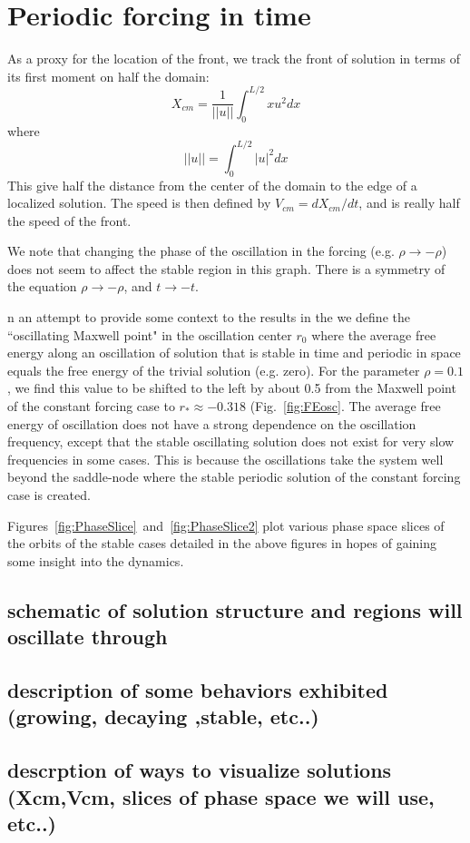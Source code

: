 \documentclass[../main/TimeForcingSHE.tex]{subfiles}
\begin{document}
\section{Periodic forcing in time }
As a proxy for the location of the front, we track the front of solution in terms of its first moment on half the domain:
\begin{equation}
X_{cm}=\frac{1}{||u||} \int_{0}^{L/2}  x u^2 dx
\end{equation}
where 
\begin{equation}
||u||= \int_{0}^{L/2}  |u|^2 dx
\end{equation}
This give half the distance from the center of the domain to the edge of a localized solution. The speed is then defined by $V_{cm} = d X_{cm}/dt$, and is really half the speed of the front.

We note that changing the phase of the oscillation in the forcing (e.g. $\rho\rightarrow-\rho$) does not seem to affect the stable region in this graph. There is a symmetry of the equation $\rho\rightarrow -\rho$, and $t \rightarrow -t$.  


n an attempt to provide some context to the results in the we define the ``oscillating Maxwell point" in the oscillation center $r_0$ where the average free energy along an oscillation of solution that is stable in time and  periodic in space equals the free energy of the trivial solution (e.g. zero).  For the parameter $\rho=0.1$, we find this value to be shifted to the left by about 0.5 from the Maxwell point of the constant forcing case to $r_*\approx -0.318$ (Fig.~\ref{fig:FEosc}.  The average free energy of oscillation does not have a strong dependence on the oscillation frequency, except that the stable oscillating solution does not exist for very slow frequencies in some cases.  This is because the oscillations take the system well beyond the saddle-node where the stable periodic solution of the constant forcing case is created.   

Figures~\ref{fig:PhaseSlice}~and~\ref{fig:PhaseSlice2}  plot various phase space slices of the orbits of the stable cases detailed in the above figures in hopes of gaining some insight into the dynamics.

\FIGphaseslice
\FIGphasesliceTWO

\subsection{schematic of solution structure and regions will oscillate through}
\subsection{description of some behaviors exhibited (growing, decaying ,stable, etc..)}
\subsection{descrption of ways to visualize solutions (Xcm,Vcm, slices of phase space we will use, etc..)}
\end{document}
